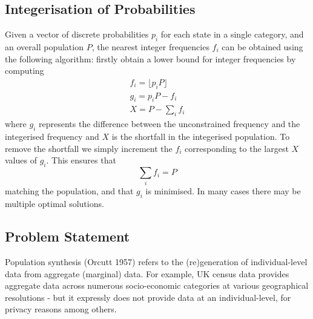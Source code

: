\documentclass{JASSS}
\begin{document}
\subsection{Integerisation of Probabilities}\label{integerisation-of-probabilities}

Given a vector of discrete probabilities \(p_i\) for each state in a single category, and an overall population \(P\), the nearest integer frequencies \(f_i\) can be obtained using the following algorithm:
firstly obtain a lower bound for integer frequencies by computing
\begin{equation}
\begin{split}
f_i = \lfloor p_{i}P \rfloor \\
g_i = p_i P - f_i \\
X = P - \sum\limits_i{f_i}
\end{split}
\end{equation}
where \(g_i\) represents the difference between the unconstrained frequency and the integerised frequency and \(X\) is the shortfall in the integerised population. To remove the shortfall we simply increment the \(f_i\) corresponding to the largest \(X\) values of \(g_i\). This ensures that
\begin{equation}
\sum\limits_i{f_i} = P 
\end{equation}
matching the population, and that \(g_i\) is minimised. In many cases there may be multiple optimal solutions. 

\subsection{Problem Statement}\label{problem-statement}

Population synthesis (Orcutt 1957) refers to the (re)generation of
individual-level data from aggregate (marginal) data. For example, UK
census data provides aggregate data across numerous socio-economic
categories at various geographical resolutions - but it expressly does
not provide data at an individual-level, for privacy reasons among
others.
\end{document}
